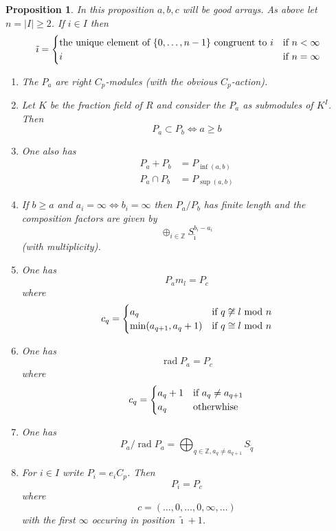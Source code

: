 \documentclass{amsproc}
\def \ZZ{{\mathbb Z}}
\def\rad{\operatorname {rad}}
\let\oldtext\text
\def\text#1{\oldtext{\upshape #1}}
\newtheorem{propositions}[lemmas]{Proposition}
\theoremstyle{definition}
\theoremstyle{remark}
\numberwithin{equation}{section}
\numberwithin{table}{section}
\numberwithin{figure}{section}
\begin{document}
\begin{propositions}
\label{ref:5.2.2a}
 In this proposition $a,b,c$ will be good
  arrays. As above let $n=|I|\ge 2$. If $i\in I$ then
\[
\tilde{\imath}=
\begin{cases}
\text{the unique element of $\{0,\ldots,n-1\}$ congruent to $i$}
  &\text{if $n<\infty$}\\
i&\text{if $n=\infty$}
\end{cases}
\]
\begin{enumerate}
\item The $P_a$ are right $C_p$-modules (with the obvious $C_p$-action).
\item Let $K$ be the fraction field of $R$ and consider the $P_a$ as
  submodules of  $K^I$. Then 
\[
P_{a}\subset P_{b}\iff a\ge b
\]
\item One also has
\begin{align*}
P_{a}+P_{b}&=P_{\inf(a,b)}\\
\label{ref:5.14a}
P_{a}\cap P_{b}&=P_{\sup(a,b)}
\end{align*}
\item
If $b\ge a$ and
$a_i=\infty\iff b_i=\infty$ 
then  $P_{a}/P_{b}$ has finite length and the composition factors  are
given by
\[
\oplus_{i\in\ZZ} S_{\tilde\imath}^{b_i-a_i}
\]
(with multiplicity).
\item
One has
\[
P_{a}m_l=P_{c}
\]
where
\[
c_q=
\begin{cases}
a_q&\text{if $q\not \cong l$ mod $n$}\\
\min(a_{q+1},a_q+1)&\text{if $q \cong l$ mod $n$}
\end{cases}
\]
\item
One has
\[
\rad P_a=P_c
\]
where
\[
c_q=
\begin{cases}
a_q+1&\text{if $a_q\neq a_{q+1}$}\\
a_q&\text{otherwhise}
\end{cases}
\]
\item
One has
\[
P_{a}/\rad P_a= \bigoplus_{q\in\ZZ,a_q\neq a_{q+1}} S_{\tilde{q}} 
\]
\item
For $i\in I$ write $P_i=e_i C_p$. Then
\[
P_i=P_{c}
\]
where
\[
c=(\ldots,0,\ldots,0,\infty,\ldots)
\]
with the first $\infty$ occuring in position $\tilde\imath+1$.
\end{enumerate}
\end{propositions}
\end{document}

